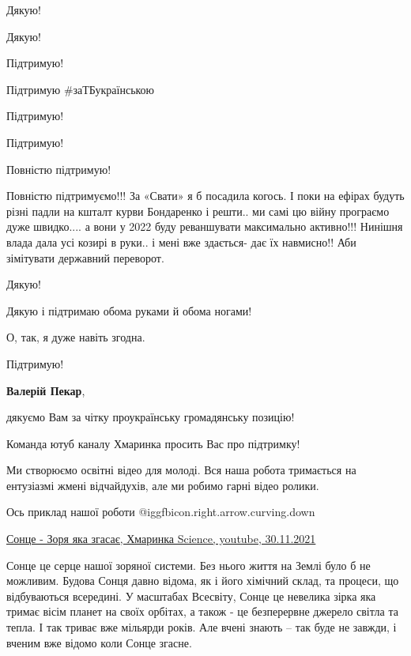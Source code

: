  
 
 
 
 
\zzSecCmt

\begin{itemize} %
Дякую!

Дякую!

Підтримую!

Підтримую \#заТБукраїнською

Підтримую!

Підтримую!

Повністю підтримую!


Повністю підтримуємо!!! За «Свати» я б посадила когось. І поки на ефірах будуть
різні падли на кшталт курви Бондаренко і решти.. ми самі цю війну програємо
дуже швидко.... а вони у 2022 буду реваншувати максимально активно!!! Нинішня
влада дала усі козирі в руки.. і мені вже здається- дає їх навмисно!! Аби
зімітувати державний переворот.

Дякую!

Дякую і підтримаю обома руками й обома ногами!

О, так, я дуже навіть згодна.

Підтримую!

\textbf{Валерій Пекар}, 

дякуємо Вам за чітку проукраїнську громадянську позицію!

Команда ютуб каналу Хмаринка просить Вас про підтримку!

Ми створюємо освітні відео для молоді. Вся наша робота тримається на ентузіазмі
жмені відчайдухів, але ми робимо гарні відео ролики.

Ось приклад нашої роботи @igg{fbicon.right.arrow.curving.down}

\href{https://www.youtube.com/watch?v=HJOZ6u48Wh0}{%
Сонце - Зоря яка згасає, Хмаринка Science, youtube, 30.11.2021%
}

Сонце це серце нашої зоряної системи. Без нього життя на Землі було б не
можливим. Будова Сонця давно відома, як і його хімічний склад, та процеси, що
відбуваються всередині. У масштабах Всесвіту, Сонце це невелика зірка яка
тримає вісім планет на своїх орбітах, а також - це безперервне джерело світла
та тепла. І так триває вже мільярди років. Але вчені знають – так буде не
завжди, і вченим вже відомо коли Сонце згасне.


\end{itemize}
